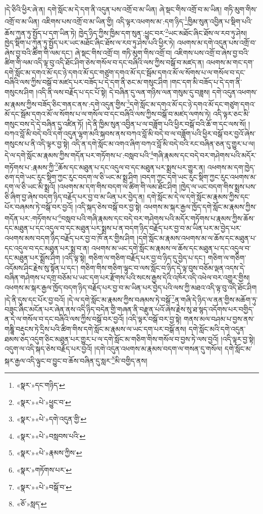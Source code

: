 །དེ་ཅིའི་ཕྱིར་ཞེ་ན། དགེ་སློང་མ་དེ་དག་ནི་འདུན་པས་འགྲོ་བ་མ་ཡིན། ཞེ་སྡང་གིས་འགྲོ་བ་མ་ཡིན། གཏི་མུག་གིས་འགྲོ་བ་མ་ཡིན། འཇིགས་པས་འགྲོ་བ་མ་ཡིན་གྱི། འདི་ལྟར་འཕགས་མ་:དག་ཉིད་\footnote{«སྣར་»དང་གཉིད་}ཁྱིམ་སུན་འབྱིན་པ་སྡིག་པའི་ཆོས་ཀུན་ཏུ་སྤྱོད་པ་དག་ཡིན་ཏེ། ཁྱེད་ཉིད་ཀྱིས་ཁྱིམ་དག་སུན་:ཕྱུང་བར་\footnote{«སྣར་»«པེ་»ཕྱུང་བ་}ཡང་མཐོང་ཞིང་ཐོས་ལ་རབ་ཏུ་ཤེས། ཁྱེད་སྡིག་པ་ཀུན་ཏུ་སྤྱོད་པར་ཡང་མཐོང་ཞིང་ཐོས་ལ་རབ་ཏུ་ཤེས་པའི་ཕྱིར་ཏེ། འཕགས་མ་དགེ་འདུན་པས་འགྲོ་བ་ཞེས་བྱ་བའི་ཚིག་གི་ལམ་དང་། ཞེ་སྡང་གིས་འགྲོ་བ། གཏི་མུག་གིས་འགྲོ་བ། འཇིགས་པས་འགྲོ་བ་ཞེས་བྱ་བའི་ཚིག་གི་ལམ་འདི་ལྟ་བུ་འདི་ཐོང་ཤིག་ཅེས་གསོལ་བ་དང་བཞིའི་ལས་ཀྱིས་བསྒོ་བ་མཛད་ན། འཕགས་མ་གང་དག་དགེ་སློང་མ་དགའ་མོ་དང་ཉེ་དགའ་མོ་དང་གཙུག་དགའ་མོ་དང་སྦོམ་དགའ་མོ་ལ་སོགས་པ་ལ་གསོལ་བ་དང་བཞིའི་ལས་ཀྱིས་བསྒོ་བ་མཛད་པར་བཟོད་པ་དེ་དག་ནི་ཅང་མ་གསུང་ཤིག །གང་དག་མི་བཟོད་པ་དེ་དག་ནི་གསུངས་ཤིག །འདི་ནི་ལས་བརྗོད་པ་དང་པོ་སྟེ། དེ་བཞིན་དུ་ལན་གཉིས་ལན་གསུམ་དུ་བཟླས། དགེ་འདུན་འཕགས་མ་རྣམས་ཀྱིས་བཟོད་ཅིང་གནང་ནས་:དགེ་འདུན་གྱིས་\footnote{«སྣར་»«པེ་»དགེ་འདུན་གྱི་}དགེ་སློང་མ་དགའ་མོ་དང་ཉེ་དགའ་མོ་དང་གཙུག་དགའ་མོ་དང་སྦོམ་དགའ་མོ་ལ་སོགས་པ་ལ་གསོལ་བ་དང་བཞིའི་ལས་ཀྱིས་བསྒོ་བ་མཛད་ལགས་ཏེ། འདི་ལྟར་ཅང་མི་གསུང་བས་དེ་དེ་བཞིན་དུ་འཛིན་ཏོ། །དེ་ནི་ཁྱིམ་སུན་འབྱིན་པ་ལ་བཟློག་པའི་ཕྱིར་བསྒོ་བའི་ཆོ་ག་དང་ལས་སོ། །བཀའ་བློ་མི་བདེ་བའི་དགེ་འདུན་ལྷག་མའི་སྐབས་ནས་བཀའ་བློ་མི་བདེ་བ་ལ་བཟློག་པའི་ཕྱིར་བསྒོ་བར་བྱའོ་ཞེས་གསུངས་པ་ནི་འདི་ལྟར་བྱ་སྟེ། འདི་ན་དགེ་སློང་མ་འགའ་ཞིག་བཀའ་བློ་མི་བདེ་བའི་རང་བཞིན་ཅན་དུ་གྱུར་པ་ལ། དེ་ལ་དགེ་སློང་མ་རྣམས་ཀྱིས་གདོན་པར་གཏོགས་པ་:བསླབ་པའི་\footnote{«སྣར་»«པེ་»བསླབས་པའི་}གཞི་རྣམས་དང་བདེ་བར་གཤེགས་པའི་མདོར་གཏོགས་པ་:རྣམས་ཀྱི་\footnote{«སྣར་»«པེ་»རྣམས་ཀྱིས་}ཆོས་དང་མཐུན་པ་དང་འདུལ་བ་དང་མཐུན་པར་སྨྲས་པར་གྱུར་ན། འཕགས་མ་དག་ཁྱེད་ཅག་དགེ་ཡང་རུང་སྡིག་ཀྱང་རུང་བདག་ལ་ཅི་ཡང་མ་སྨྲ་ཤིག །བདག་ཀྱང་དགེ་ཡང་རུང་སྡིག་ཀྱང་རུང་འཕགས་མ་དག་ལ་ཅི་ཡང་མི་སྨྲའོ། །འཕགས་མ་དག་གིས་བདག་ལ་ཚིག་གི་ལམ་ཐོང་ཤིག །ཁྱེད་ལ་ཡང་བདག་གིས་སྨྲས་པས་ཅི་ཞིག་བྱ་ཞེས་བདག་ཉིད་བརྗོད་པར་བྱ་བ་མ་ཡིན་པར་བྱེད་ན། དགེ་སློང་མ་དེ་ལ་དགེ་སློང་མ་རྣམས་ཀྱིས་དང་པོར་བཞམས་ཏེ་བསྒོ་བར་བྱའོ། །འདི་སྐད་ཅེས་བསྒོ་བར་བྱ་སྟེ། འཕགས་མ་སྐར་རྒྱལ་ཁྱོད་དགེ་སློང་མ་རྣམས་ཀྱིས་གདོན་པར་:གཏོགས་པ་\footnote{«སྣར་»གཏོགས་པར་}བསླབ་པའི་གཞི་རྣམས་དང་བདེ་བར་གཤེགས་པའི་མདོར་གཏོགས་པ་རྣམས་ཀྱིས་ཆོས་དང་མཐུན་པ་དང་འདུལ་བ་དང་མཐུན་པར་སྨྲས་པ་ན་བདག་ཉིད་བརྗོད་པར་བྱ་བ་མ་ཡིན་པར་མ་བྱེད་པར་འཕགས་མས་བདག་ཉིད་བརྗོད་པར་བྱ་བ་ཁོ་ནར་གྱིས་ཤིག །དགེ་སློང་མ་རྣམས་འཕགས་མ་ལ་ཆོས་དང་མཐུན་པ་དང་འདུལ་བ་དང་མཐུན་པར་སྨྲ་བ་ན། འཕགས་མ་ཡང་དགེ་སློང་མ་རྣམས་ལ་ཆོས་དང་མཐུན་པ་དང་འདུལ་བ་དང་མཐུན་པར་སྨྲོས་ཤིག །འདི་ལྟ་སྟེ། གཅིག་ལ་གཅིག་བརྗོད་པར་བྱ་བ་ཉིད་དུ་བྱེད་པ་དང་། གཅིག་ལ་གཅིག་འདོམས་ཤིང་རྗེས་སུ་སྟོན་པ་དང་། གཅིག་གིས་གཅིག་ལྟུང་བ་ལས་སློང་བ་ཉིད་དེ་ལྟ་བུས་བཅོམ་ལྡན་འདས་དེ་བཞིན་གཤེགས་པ་དགྲ་བཅོམ་པ་ཡང་དག་པར་རྫོགས་པའི་སངས་རྒྱས་དེའི་འཁོར་འདི་འཕེལ་བར་འགྱུར་གྱིས། འཕགས་མ་སྐར་རྒྱལ་ཁྱོད་བདག་ཉིད་བརྗོད་པར་བྱ་བ་མ་ཡིན་པར་བྱེད་པའི་ལས་ཀྱི་མཐའ་འདི་ལྟ་བུ་འདི་ཐོང་ཤིག །དེ་ནི་དུས་དང་པོར་བྱ་བའོ། །དེ་ལ་དགེ་སློང་མ་རྣམས་ཀྱིས་བཞམས་ཏེ་བསྒོ་\footnote{«སྣར་»«པེ་»བསྒོ་བ་}ན་གཞི་དེ་ཉིད་ལ་ནན་གྱིས་མཆོག་ཏུ་བཟུང་ཞིང་མངོན་པར་ཞེན་ནས་འདི་ཉིད་བདེན་གྱི་གཞན་ནི་བརྫུན་པའོ་ཞེས་རྗེས་སུ་ཐ་སྙད་འདོགས་པར་བགྱིད་ན་དེ་ལ་གསོལ་བ་དང་བཞིའི་ལས་ཀྱིས་བསྒོ་བར་བྱའོ། །འདི་ལྟར་བསྒོ་བར་བྱ་སྟེ། གནས་མལ་བཤམ་པ་བྱས་ནས་གཎྜཱི་བརྡུངས་ཏེ་དྲིས་པའི་ཚིག་གིས་དགེ་སློང་མ་རྣམས་ལ་ཡང་དག་པར་བསྒོ་ནས། དགེ་སློང་མའི་དགེ་འདུན་ཐམས་ཅད་འདུག་ཅིང་མཐུན་པར་གྱུར་པ་ལ་དགེ་སློང་མ་གཅིག་གིས་གསོལ་བ་བྱས་ཏེ་ལས་བྱའོ། །འདི་ལྟར་བྱ་སྟེ། འདུག་ལ་འདི་སྐད་ཅེས་བརྗོད་པར་བྱའོ། །དགེ་འདུན་འཕགས་མ་རྣམས་བདག་ལ་གསན་དུ་གསོལ། དགེ་སློང་མ་སྐར་རྒྱལ་འདི་ལྟུང་བ་བྱུང་བ་ཆོས་བཞིན་དུ་སླར་\footnote{«ཅོ་»སླད་}མི་བགྱིད་ནས། 